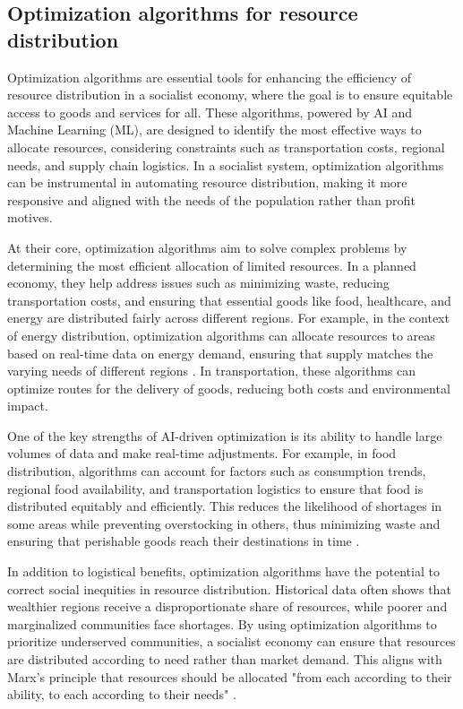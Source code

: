 \begin{refsection}
\subsection{Optimization algorithms for resource distribution}

Optimization algorithms are essential tools for enhancing the efficiency of resource distribution in a socialist economy, where the goal is to ensure equitable access to goods and services for all. These algorithms, powered by AI and Machine Learning (ML), are designed to identify the most effective ways to allocate resources, considering constraints such as transportation costs, regional needs, and supply chain logistics. In a socialist system, optimization algorithms can be instrumental in automating resource distribution, making it more responsive and aligned with the needs of the population rather than profit motives.

At their core, optimization algorithms aim to solve complex problems by determining the most efficient allocation of limited resources. In a planned economy, they help address issues such as minimizing waste, reducing transportation costs, and ensuring that essential goods like food, healthcare, and energy are distributed fairly across different regions. For example, in the context of energy distribution, optimization algorithms can allocate resources to areas based on real-time data on energy demand, ensuring that supply matches the varying needs of different regions \cite[pp.~112-115]{tapscott2016}. In transportation, these algorithms can optimize routes for the delivery of goods, reducing both costs and environmental impact.

One of the key strengths of AI-driven optimization is its ability to handle large volumes of data and make real-time adjustments. For example, in food distribution, algorithms can account for factors such as consumption trends, regional food availability, and transportation logistics to ensure that food is distributed equitably and efficiently. This reduces the likelihood of shortages in some areas while preventing overstocking in others, thus minimizing waste and ensuring that perishable goods reach their destinations in time \cite[pp.~89-92]{treccani2021}.

In addition to logistical benefits, optimization algorithms have the potential to correct social inequities in resource distribution. Historical data often shows that wealthier regions receive a disproportionate share of resources, while poorer and marginalized communities face shortages. By using optimization algorithms to prioritize underserved communities, a socialist economy can ensure that resources are distributed according to need rather than market demand. This aligns with Marx’s principle that resources should be allocated "from each according to their ability, to each according to their needs" \cite[pp.~245-248]{marx2023}.


\end{refsection}
